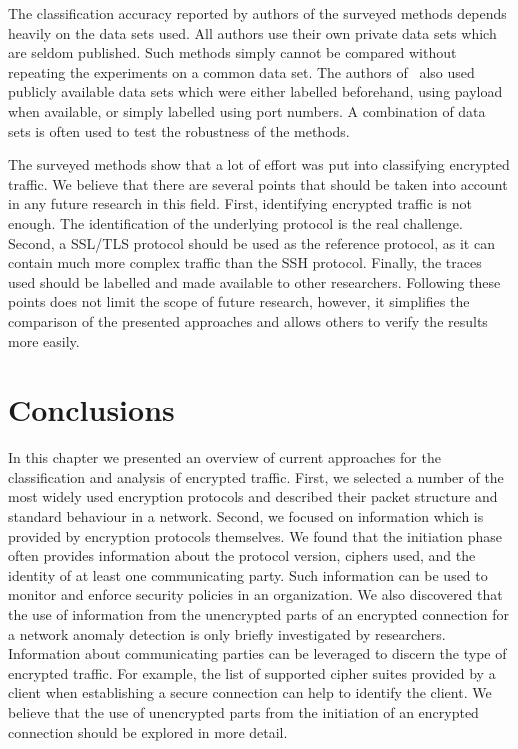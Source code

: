 The classification accuracy reported by authors of the surveyed methods depends heavily on the data sets used. All authors use their own private data sets which are seldom published. Such methods simply cannot be compared without repeating the experiments on a common data set. The authors of~\cite{Alshammari-2007-flow, Alshammari-2009-Machine, Alshammari-2011-Can, Arndt-2011-Comparison, Sun-2010-Novel, Zhang-2013-Encrypted} also used publicly available data sets which were either labelled beforehand, using payload when available, or simply labelled using port numbers. A combination of data sets is often used to test the robustness of the methods. 

The surveyed methods show that a lot of effort was put into classifying encrypted traffic. We believe that there are several points that should be taken into account in any future research in this field. First, identifying encrypted traffic is not enough. The identification of the underlying protocol is the real challenge. Second, a SSL/TLS protocol should be used as the reference protocol, as it can contain much more complex traffic than the SSH protocol. Finally, the traces used should be labelled and made available to other researchers. Following these points does not limit the scope of future research, however, it simplifies the comparison of the presented approaches and allows others to verify the results more easily.




\section{Conclusions} \label{sec:enc-conclusions}

In this chapter we presented an overview of current approaches for the classification and analysis of encrypted traffic. First, we selected a number of the most widely used encryption protocols and described their packet structure and standard behaviour in a network. Second, we focused on information which is provided by encryption protocols themselves. We found that the initiation phase often provides information about the protocol version, ciphers used, and the identity of at least one communicating party. Such information can be used to monitor and enforce security policies in an organization. We also discovered that the use of information from the unencrypted parts of an encrypted connection for a network anomaly detection is only briefly investigated by researchers. Information about communicating parties can be leveraged to discern the type of encrypted traffic. For example, the list of supported cipher suites provided by a client when establishing a secure connection can help to identify the client. We believe that the use of unencrypted parts from the initiation of an encrypted connection should be explored in more detail.

